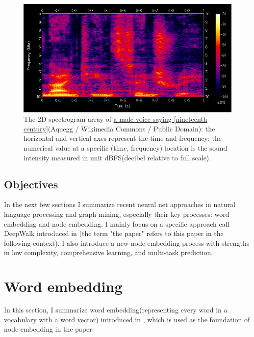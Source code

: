 \documentclass{article}
\begin{document}
\begin{figure}[h]
	\centering
	\includegraphics[width=\linewidth]{Spectrogram-19thC}
	\caption{The 2D spectrogram array of \href{https://commons.wikimedia.org/wiki/File:Spectrogram-19thC.png}{a male voice saying [nineteenth century]}(Aquegg / Wikimedia Commons / Public Domain): the horizontal and vertical axes represent the time and frequency; the numerical value at a specific (time, frequency) location is the sound intensity measured in unit dBFS(decibel relative to full scale).}
	\label{fig:Spectrogram-19thC}
\end{figure}

\subsection{Objectives}
In the next few sections I summarize recent neural net approaches in natural language processing and graph mining, especially their key processes: word embedding and node embedding. I mainly focus on a specific approach call DeepWalk introduced in \cite{perozzi2014deepwalk} (the term "the paper" refers to this paper in the following context). I also introduce a new node embedding process with strengths in low complexity, comprehensive learning, and multi-task prediction.

\section{Word embedding}
In this section, I summarize word embedding(representing every word in a vocabulary with a word vector) introduced in \cite{mikolov2013efficient}, which is used as the foundation of node embedding in the paper.
\end{document}
